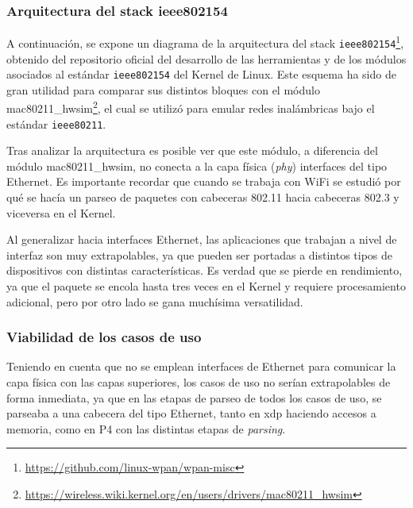 \subsubsection{Arquitectura del stack ieee802154}

A continuación, se expone un diagrama de la arquitectura del stack \texttt{ieee802154}\footnote{\url{https://github.com/linux-wpan/wpan-misc}}, obtenido del repositorio oficial del desarrollo de las herramientas y de los módulos asociados al estándar \texttt{ieee802154} del Kernel de Linux. Este esquema ha sido de gran utilidad para comparar sus distintos bloques con el módulo mac80211\_hwsim\footnote{\url{https://wireless.wiki.kernel.org/en/users/drivers/mac80211_hwsim}}, el cual se utilizó para emular redes inalámbricas bajo el estándar \texttt{ieee80211}.





\newpage

Tras analizar la arquitectura es posible ver que este módulo, a diferencia del módulo mac80211\_hwsim, no conecta a la capa física (\textit{phy}) interfaces del tipo Ethernet. Es importante recordar que cuando se trabaja con WiFi se estudió por qué se hacía un parseo de paquetes con cabeceras 802.11 hacia cabeceras 802.3 y viceversa en el Kernel.\\
\par

Al generalizar hacia interfaces Ethernet, las aplicaciones que trabajan a nivel de interfaz son muy extrapolables, ya que pueden ser portadas a distintos tipos de dispositivos con distintas características. Es verdad que se pierde en rendimiento, ya que el paquete se encola hasta tres veces en el Kernel y requiere procesamiento adicional, pero por otro lado se gana muchísima versatilidad.

\subsubsection{Viabilidad de los casos de uso}

 Teniendo en cuenta que no se emplean interfaces de Ethernet para comunicar la capa física con las capas superiores, los casos de uso no serían extrapolables de forma inmediata, ya que en las etapas de parseo de todos los casos de uso, se parseaba a una cabecera del tipo Ethernet, tanto en \gls{xdp} haciendo accesos a memoria, como en P4 con las distintas etapas de \textit{parsing}.\\
\par

